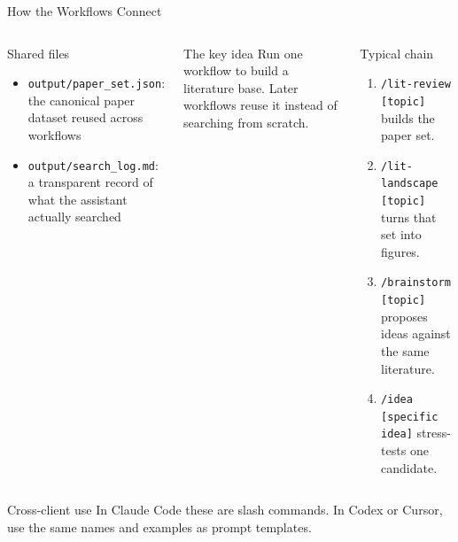 \documentclass[aspectratio=169,professionalfonts]{beamer}
\begin{document}
\begin{frame}[t]{How the Workflows Connect}
\footnotesize
\begin{columns}[T,onlytextwidth]
\begin{block}{Shared files}
\begin{itemize}
  \item \texttt{output/paper\_set.json}: the canonical paper dataset reused across workflows
  \item \texttt{output/search\_log.md}: a transparent record of what the assistant actually searched
\end{itemize}
\end{block}
\begin{block}{The key idea}
Run one workflow to build a literature base. Later workflows reuse it instead of searching from scratch.
\end{block}
\begin{exampleblock}{Typical chain}
\begin{enumerate}
  \item \texttt{/lit-review [topic]} builds the paper set.
  \item \texttt{/lit-landscape [topic]} turns that set into figures.
  \item \texttt{/brainstorm [topic]} proposes ideas against the same literature.
  \item \texttt{/idea [specific idea]} stress-tests one candidate.
\end{enumerate}
\end{exampleblock}
\end{columns}
\vspace{0.4em}
\begin{block}{Cross-client use}
\footnotesize In Claude Code these are slash commands. In Codex or Cursor, use the same names and examples as prompt templates.
\end{block}
\end{frame}
\end{document}
